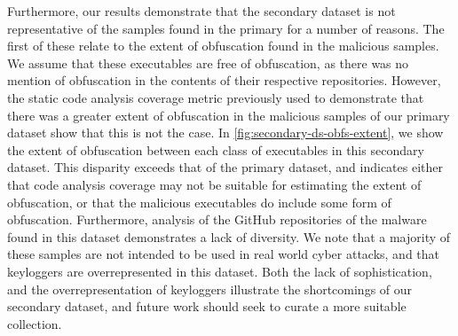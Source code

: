 \documentclass[conference,compsoc]{IEEEtran}
\begin{document}

Furthermore, our results demonstrate that the secondary dataset is not representative of the samples found in the primary for a number of reasons. The first of these relate to the extent of obfuscation found in the malicious samples. We assume that these executables are free of obfuscation, as there was no mention of obfuscation in the contents of their respective repositories. However, the static code analysis coverage metric previously used to demonstrate that there was a greater extent of obfuscation in the malicious samples of our primary dataset show that this is not the case. In \ref{fig:secondary-ds-obfs-extent}, we show the extent of obfuscation between each class of executables in this secondary dataset. This disparity exceeds that of the primary dataset, and indicates either that code analysis coverage may not be suitable for estimating the extent of obfuscation, or that the malicious executables do include some form of obfuscation. Furthermore, analysis of the GitHub repositories of the malware found in this dataset demonstrates a lack of diversity. We note that a majority of these samples are not intended to be used in real world cyber attacks, and that keyloggers are overrepresented in this dataset. Both the lack of sophistication, and the overrepresentation of keyloggers illustrate the shortcomings of our secondary dataset, and future work should seek to curate a more suitable collection.  
\end{document}
